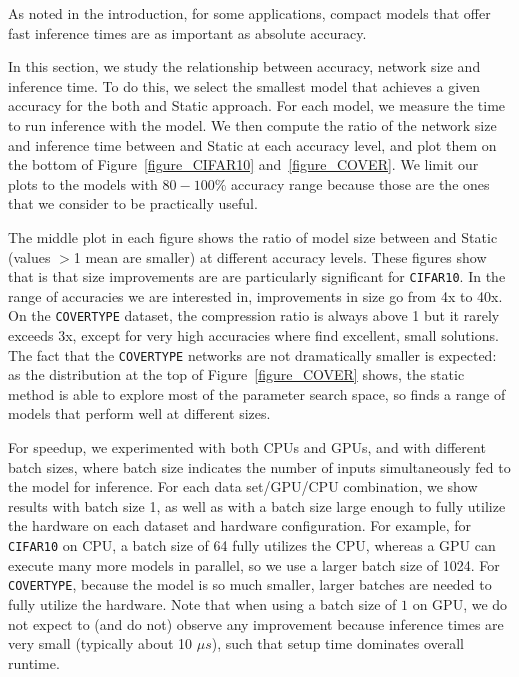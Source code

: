 As noted in the introduction, for some applications, compact models that offer
fast inference times are as important as absolute accuracy. 


In this section, we study the relationship between accuracy, network size and
inference time.  To do this, we select the smallest model that achieves a given
accuracy for the both \shrink and Static approach.  For each model, we measure
the time to run inference with the model.  We then compute the ratio of the
network size and inference time between \shrink and Static at each accuracy
level, and plot them on the bottom of Figure~\ref{figure_CIFAR10}
and~\ref{figure_COVER}.  We limit our plots to the models with $80-100\%$
accuracy range because those are the ones that we consider to be practically
useful.

The middle plot in each figure shows the ratio of model size between \shrink
and Static (values $>$1 mean \shrink are smaller) at different accuracy levels.
These figures show that is that size improvements are are particularly
significant for  \texttt{CIFAR10}. In the range of accuracies we are interested
in, improvements in size go from 4x to 40x. On the \texttt{COVERTYPE} dataset,
the compression ratio is always above 1 but it rarely exceeds 3x, except for
very high accuracies where \shrink find excellent, small solutions.  The fact
that the  \texttt{COVERTYPE} networks are not dramatically smaller is expected:
as the distribution at the top of Figure~\ref{figure_COVER} shows, the static
method is able to explore most of the parameter search space, so finds a range
of models that perform well at different sizes.

For speedup, we experimented with both CPUs and GPUs, and with different batch
sizes, where batch size indicates the number of inputs simultaneously fed to the
model for inference.  For each data set/GPU/CPU combination, we show results
with batch size 1, as well as with a batch size large enough to fully utilize
the hardware on each dataset and hardware configuration.  For example, for {\tt
CIFAR10} on CPU, a batch size of 64 fully utilizes the CPU, whereas a GPU can
execute many more models in parallel, so we use a larger batch size of 1024.
For {\tt COVERTYPE}, because the model is so much smaller, larger batches are
needed to fully utilize the hardware.  Note that when using a batch size of $1$
on GPU, we do not expect to (and do not) observe any improvement because
inference times are very small (typically about 10 $\mu s$), such that setup
time dominates overall runtime.  

